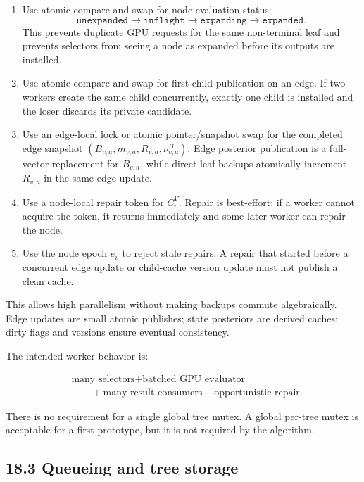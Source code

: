 \documentclass[11pt]{article}
\begin{document}
\begin{enumerate}[leftmargin=2em]
  \item Use atomic compare-and-swap for node evaluation status:
  \[
  \texttt{unexpanded}\rightarrow\texttt{inflight}\rightarrow\texttt{expanding}\rightarrow\texttt{expanded}.
  \]
  This prevents duplicate GPU requests for the same non-terminal leaf and prevents
  selectors from seeing a node as expanded before its outputs are installed.

  \item Use atomic compare-and-swap for first child publication on an edge. If
  two workers create the same child concurrently, exactly one child is installed
  and the loser discards its private candidate.

  \item Use an edge-local lock or atomic pointer/snapshot swap for the completed
  edge snapshot \((B_{v,a},m_{v,a},R_{v,a},\nu^B_{v,a})\). Edge posterior
  publication is a full-vector replacement for \(B_{v,a}\), while direct leaf
  backups atomically increment \(R_{v,a}\) in the same edge update.

  \item Use a node-local repair token for \(C^V_v\). Repair is best-effort: if a
  worker cannot acquire the token, it returns immediately and some later worker
  can repair the node.

  \item Use the node epoch \(e_v\) to reject stale repairs. A repair that started
  before a concurrent edge update or child-cache version update must not publish
  a clean cache.
\end{enumerate}

This allows high parallelism without making backups commute algebraically. Edge
updates are small atomic publishes; state posteriors are derived caches; dirty
flags and versions ensure eventual consistency.

The intended worker behavior is:

\[
\begin{aligned}
&\text{many selectors}
+\text{batched GPU evaluator}\\
&\qquad
+\text{many result consumers}
+\text{opportunistic repair}.
\end{aligned}
\]

There is no requirement for a single global tree mutex. A global per-tree mutex
is acceptable for a first prototype, but it is not required by the algorithm.

\subsection*{18.3 Queueing and tree storage}
\end{document}
